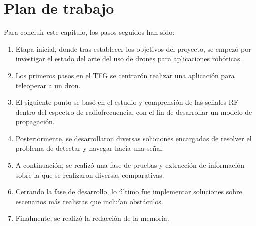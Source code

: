 \section{Plan de trabajo}
\label{sec:plantrabajo}

Para concluir este capítulo, los pasos seguidos han sido:

\begin{enumerate}
	\item Etapa inicial, donde tras establecer los objetivos del proyecto, se empezó por investigar el estado del arte del uso de drones para aplicaciones robóticas.
	\item Los primeros pasos en el \ac{TFG} se centrarón realizar una aplicación para teleoperar a un dron.
	\item El siguiente punto se basó en el estudio y comprensión de las señales \ac{RF} dentro del espectro de radiofrecuencia, con el fin de desarrollar un modelo de propagación.
	\item Posteriormente, se desarrollaron diversas soluciones encargadas de resolver el problema de detectar y navegar hacia una señal.
	\item A continuación, se realizó una fase de pruebas y extracción de información sobre la que se realizaron diversas comparativas.
	\item Cerrando la fase de desarrollo, lo último fue implementar soluciones sobre escenarios más realistas que incluían obstáculos.
	\item Finalmente, se realizó la redacción de la memoria.
\end{enumerate} 